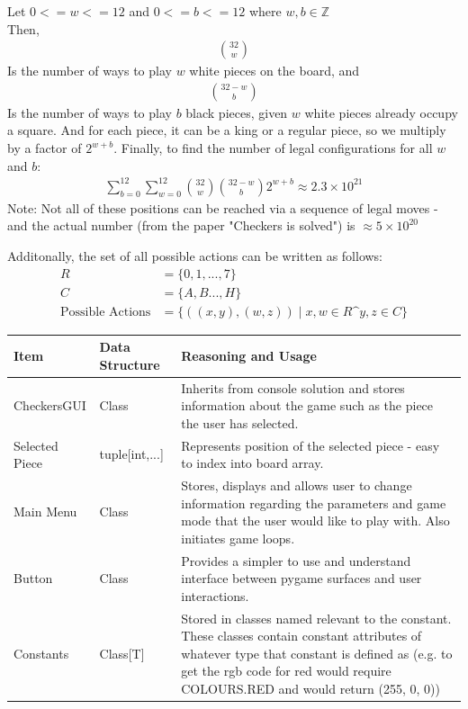 \documentclass{article}
\makeatletter
\newcommand\subsubsubsection{\@startsection{paragraph}{4}{\z@}{-2.5ex\@plus -1ex \@minus -.25ex}{1.25ex \@plus .25ex}{\normalfont\normalsize\bfseries}}
\makeatother
\begin{document}
    \noindent Let $0 <= w <= 12$ and $0 <= b <= 12$  where $w,b \in \mathbb{Z}$\\
    Then,
    \begin{align}
        {32}\choose{w}
    \end{align}
    Is the number of ways to play $w$ white pieces on the board, and
    \begin{align}
        {32-w}\choose{b}
    \end{align}
    Is the number of ways to play $b$ black pieces, given $w$ white pieces already occupy a square.
    And for each piece, it can be a king or a regular piece, so we multiply by a factor of $2^{w+b}$.
    Finally, to find the number of legal configurations for all $w$ and $b$:
    \begin{align}
        \sum_{b=0}^{12}\sum_{w=0}^{12} {{32}\choose{w}} {{32-w}\choose{b}} 2^{w+b} \approx 2.3\times10^{21}
    \end{align}
    Note: Not all of these positions can be reached via a sequence of legal moves - and the actual number (from
    the paper "Checkers is solved") is $\approx 5 \times 10^{20}$

    Additonally, the set of all possible actions can be written as follows:
    \begin{align}
        R &= \{0,1, ... ,7\}\\
        C &= \{A, B ..., H\}\\
        \text{Possible Actions} &= \{((x,y), (w,z)) \mid x, w \in R \text{^} y,z \in C\}
    \end{align}

    \subsubsubsection{GUI Add-on} \label{CheckersGUIDesignStage}
    \begin{center}
        \begin{tabular}{|m{10em} | m{12em} | m{15em}|}
            \hline 
                Item & Data Structure & Reasoning and Usage \\
            \hline
            \hline
                CheckersGUI & Class & Inherits from console solution and stores information about the game such as the piece the user has selected. \\
            \hline
                Selected Piece & tuple[int,...] & Represents position of the selected piece - easy to index into board array. \\
            \hline
                Main Menu & Class & Stores, displays and allows user to change information regarding the parameters and game mode that the user would like to play with. Also initiates game loops.\\
            \hline
                Button & Class & Provides a simpler to use and understand interface between pygame surfaces and user interactions. \\
            \hline
                Constants & Class[T] & Stored in classes named relevant to the constant. These classes contain constant attributes of whatever type that constant is defined as (e.g. to get the rgb code for red would require COLOURS.RED and would return (255, 0, 0)) \\
            \hline
        \end{tabular}
    \end{center}
\end{document}
